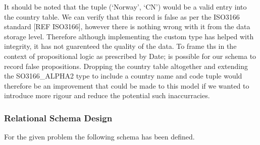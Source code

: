 \documentclass[12pt]{article}
\begin{document}
It should be noted that the tuple (`Norway', `CN') would be a valid entry into the country table. We can verify that this record is false as per the ISO3166 standard [REF ISO3166], however there is nothing wrong with it from the data storage level. Therefore although implementing the custom type has helped with integrity, it has not guarenteed the quality of the data. To frame ths in the context of propositional logic as prescribed by Date; is possible for our schema to record false propositions. Dropping the country table altogether and extending the SO3166\_ALPHA2 type to include a country name and code tuple would therefore be an improvement that could be made to this model if we wanted to introduce more rigour and reduce the potential such inaccurracies.

\subsubsection{Relational Schema Design}
For the given problem the following schema has been defined. \\
\end{document}
